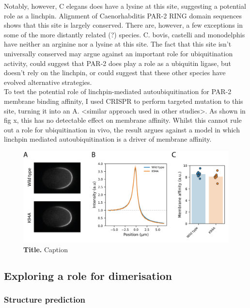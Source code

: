 \documentclass[12pt]{"article"}
\newcommand{\mycaption}[2]{\caption[#1]{\textbf{#1.} #2}}
\begin{document}
Notably, however, C elegans does have a lysine at this site, suggesting a potential role as a linchpin. Alignment of Caenorhabditis PAR-2 RING domain sequences shows that this site is largely conserved. There are, however, a few exceptions in some of the more distantly related (?) species. C. bovis, castelli and monodelphis have neither an arginine nor a lysine at this site. The fact that this site isn’t universally conserved may argue against an important role for ubiquitination activity, could suggest that PAR-2 does play a role as a ubiquitin ligase, but doesn’t rely on the linchpin, or could suggest that these other species have evolved alternative strategies.\\ 


To test the potential role of linchpin-mediated autoubiquitination for PAR-2 membrane binding affinity, I used CRISPR to perform targeted mutation to this site, turning it into an A. <similar approach used in other studies>. As shown in fig x, this has no detectable effect on membrane affinity. Whilst this cannot rule out a role for ubiquitination in vivo, the result argues against a model in which linchpin mediated autoubiquitination is a driver of membrane affinity. \\


\begin{figure}[!h]
\includegraphics[scale=0.9]{linchpin_in_vivo}
\setlength{\abovecaptionskip}{20pt}
\centering
\mycaption{Title}{Caption}
\end{figure}

\clearpage
\subsection{Exploring a role for dimerisation}

\subsubsection{Structure prediction}
\end{document}
